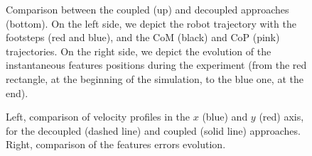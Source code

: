 \begin{figure}[ht]
 \caption{\label{Fig:Comparisons-approaches} Comparison between the coupled (up) and decoupled approaches (bottom). On the left side, we depict the robot trajectory with the footsteps (red and blue), and the CoM (black) and CoP (pink) trajectories. On the right side, we depict the evolution of the instantaneous features positions during the experiment (from the red rectangle, at the beginning of the simulation, to the blue one, at the end).}
 \end{figure}

\begin{figure}[ht]
 \centering
 \caption{\label{Fig:Comparisons-velocitieserrors} Left, comparison of velocity profiles in the $x$ (blue) and $y$ (red) axis, for the decoupled (dashed line) and coupled (solid line) approaches. Right, comparison of the features errors evolution.}
 \end{figure}

